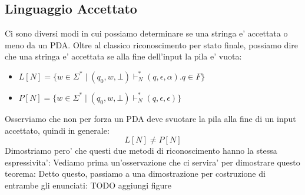 \subsection{Linguaggio Accettato}
Ci sono diversi modi in cui possiamo determinare se una stringa e' accettata o meno da un PDA. Oltre al classico riconoscimento per stato finale, possiamo dire che una stringa e' accettata se alla fine dell'input la pila e' vuota:
\begin{itemize}
  \item $ L[N] = \{w \in \Sigma^* \mid (q_0, w, \bot) \vdash^*_N (q, \epsilon, \alpha). q \in F\} $
  \item $ P[N] = \{w \in \Sigma^* \mid (q_0, w, \bot) \vdash^*_N (q, \epsilon, \epsilon)\} $
\end{itemize}

Osserviamo che non per forza un PDA deve svuotare la pila alla fine di un input accettato, quindi in generale:
\[
  L[N] \neq P[N]
\]
Dimostriamo pero' che questi due metodi di riconoscimento hanno la stessa espressivita':
Vediamo prima un'osservazione che ci servira' per dimostrare questo teorema:
Detto questo, passiamo a una dimostrazione per costruzione di entrambe gli enunciati: TODO aggiungi figure
